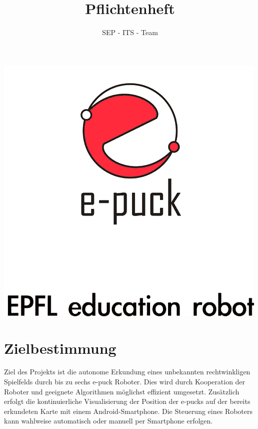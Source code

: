 \documentclass[10pt,a4paper]{article}
\author{SEP - ITS - Team}
\title{Pflichtenheft}
\begin{document}
	\maketitle
	\includegraphics[scale=0.5, origin=c]{logo.png}
	\newpage
	
	\section{Zielbestimmung}
		Ziel des Projekts ist die autonome Erkundung eines unbekannten rechtwinkligen Spielfelds durch bis zu
		sechs e-puck Roboter. Dies wird durch Kooperation der Roboter und geeignete Algorithmen möglichst
		effizient umgesetzt. Zusätzlich erfolgt die kontinuierliche Visualisierung der Position der e-pucks auf der
		bereits erkundeten Karte mit einem Android-Smartphone. Die Steuerung eines Roboters kann wahlweise
		automatisch oder manuell per Smartphone erfolgen.
\end{document}
